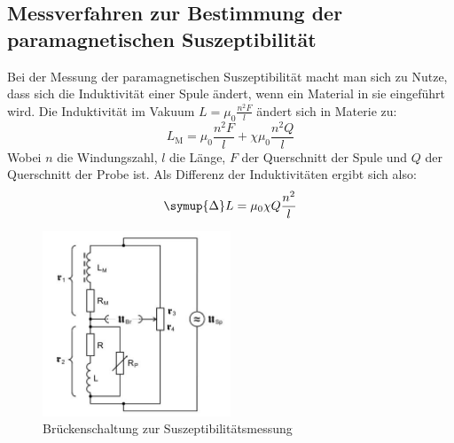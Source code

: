 \subsection{Messverfahren zur Bestimmung der paramagnetischen Suszeptibilität}
\label{sec:mess}
Bei der Messung der paramagnetischen Suszeptibilität macht man sich zu Nutze, dass sich die Induktivität einer Spule ändert, wenn ein Material in sie eingeführt wird. Die Induktivität im Vakuum $L = \mu_0 \frac{n^2 F}{l}$ ändert sich in Materie zu:
\begin{equation}
    L_\text{M} = \mu_0 \frac{n^2 F}{l} + \chi \mu_0 \frac{n^2 Q}{l} 
\end{equation}
Wobei $n$ die Windungszahl, $l$ die Länge, $F$ der Querschnitt der Spule und $Q$ der Querschnitt der Probe ist.
Als Differenz der Induktivitäten ergibt sich also: 
\begin{equation}
    \symup{\Delta} L = \mu_0 \chi Q \frac{n^2}{l} 
\end{equation}

\begin{figure}[H]
    \centering
    \includegraphics[width=0.5\textwidth]{content/bruecke.JPG}
    \caption{Brückenschaltung zur Suszeptibilitätsmessung \cite{versuchsanleitung}}
    \label{fig:bruecke}
  \end{figure}

